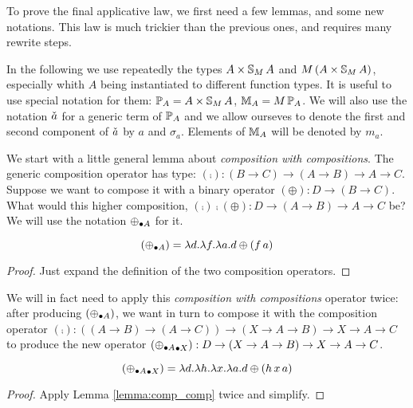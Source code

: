 
To prove the final applicative law, we first need a few lemmas, and some new notations. This law is much trickier than the previous ones, and requires many rewrite steps.

In the following we use repeatedly the types $A\times \mathbb{S}_{M}\,A$ and $M\,(A\times \mathbb{S}_{M}\,A)$, especially whith $A$ being instantiated to different function types.
It is useful to use special notation for them:
$\mathbb{P}_{A} = A\times \mathbb{S}_{M}\,A$, $\mathbb{M}_{A} = M\,\mathbb{P}_{A}$.
We will also use the notation $\check{a}$ for a generic term of $\mathbb{P}_{A}$
and we allow ourseves to denote the first and second component of $\check{a}$ by $a$ and $\sigma_a$.
Elements of $\mathbb{M}_{A}$ will be denoted by $m_a$.

We start with a little general lemma about {\em composition with compositions}.
The generic composition operator has type: $(\comp): (B\rightarrow C) \rightarrow (A\rightarrow B) \rightarrow A \rightarrow C$.
Suppose we want to compose it with a binary operator $(\oplus) : D\rightarrow (B\rightarrow C)$.
What would this higher composition, $(\comp) \comp (\oplus) : D \rightarrow (A\rightarrow B) \rightarrow A \rightarrow C$ be?
We will use the notation $\mathbin{\oplus_{\bullet A}}$ for it.
\begin{lemma}\label{lemma:comp_comp}
$$
(\mathbin{\oplus_{\bullet A}}) = \lambda d.\lambda f. \lambda a. d\oplus (f\,a)
$$
\end{lemma}
\begin{proof}
Just expand the definition of the two composition operators.
\end{proof}

We will in fact need to apply this {\em composition with compositions} operator twice: after producing $(\mathbin{\oplus_{\bullet A}})$, we want in turn to compose it with the composition operator $(\comp): ((A\rightarrow B) \rightarrow (A\rightarrow C)) \rightarrow (X\rightarrow A\rightarrow B) \rightarrow X \rightarrow A \rightarrow C$ to produce the new operator $(\mathbin{\mathbin{\oplus_{\bullet A}}_{\bullet X}}): D\rightarrow (X\rightarrow A \rightarrow B) \rightarrow X \rightarrow A \rightarrow C$.
\begin{lemma}\label{lemma:comp_comp_comp}
$$
(\mathbin{\mathbin{\oplus_{\bullet A}}_{\bullet X}}) =
\lambda d. \lambda h. \lambda x.\lambda a. d\oplus (h\,x\,a)
$$
\end{lemma}
\begin{proof}
Apply Lemma \ref{lemma:comp_comp} twice and simplify.
\end{proof}

